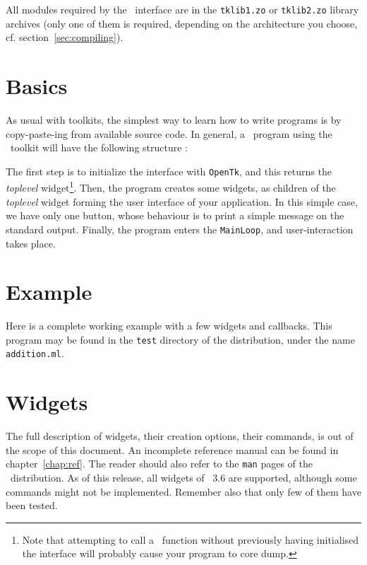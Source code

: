All modules required by the \camltk\ interface are in the \verb|tklib1.zo|
or \verb|tklib2.zo| library archives (only one of them is required,
depending on the architecture you choose, cf. section~\ref{sec:compiling}).

\section{Basics}
As usual with toolkits, the simplest way to learn how to write programs is
by copy-paste-ing from available source code. In general, a \caml\ program
using the \tk\ toolkit will have the following structure :

\begin{alltt}

\end{alltt}

The first step is to initialize the interface with \verb|OpenTk|, and this
returns the {\em toplevel} widget\footnote{Note that attempting to call a
\camltk\ function without previously having initialised the interface will
probably cause your program to core dump.}.
Then, the program creates some widgets, as children of the {\em toplevel}
widget forming the user interface of your application. In this simple case,
we have only one button, whose behaviour is to print a simple message on the
standard output. Finally, the program enters the \verb|MainLoop|, and
user-interaction takes place.

\section{Example}
Here is a complete working example with a few widgets and callbacks.
This program may be found in the \verb|test| directory of the distribution,
under the name \verb|addition.ml|.

\begin{alltt}

\end{alltt}

\section{Widgets}
The full description of widgets, their creation options, their commands, is
out of the scope of this document. An incomplete reference manual can be
found in chapter~\ref{chap:ref}.
The reader should also refer to the \verb|man| pages of the \tk\
distribution. 
As of this release, all widgets of \tk\ 3.6 are supported, although some
commands might not be implemented. Remember also that only few of them have
been tested.

